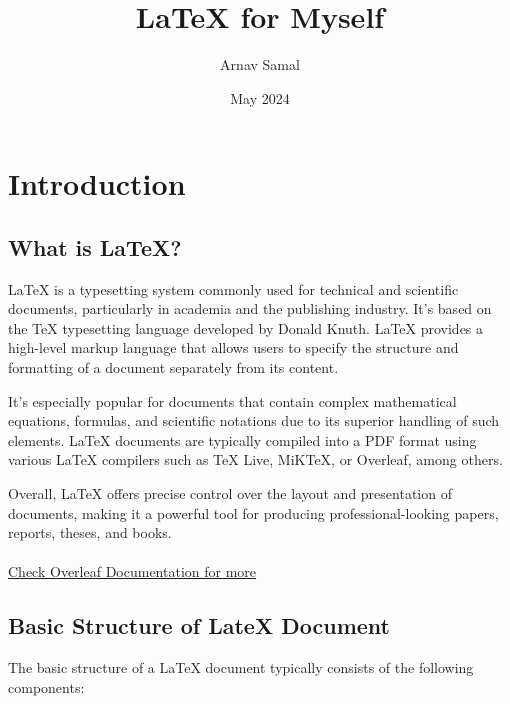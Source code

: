 \documentclass{article}
\title{LaTeX for Myself}
\author{Arnav Samal}
\date{May 2024}
\begin{document}
\maketitle

\section{Introduction}

\subsection{What is LaTeX?}

LaTeX is a typesetting system commonly used for technical and scientific documents, particularly in academia and the publishing industry. It's based on the TeX typesetting language developed by Donald Knuth. LaTeX provides a high-level markup language that allows users to specify the structure and formatting of a document separately from its content.

It's especially popular for documents that contain complex mathematical equations, formulas, and scientific notations due to its superior handling of such elements. LaTeX documents are typically compiled into a PDF format using various LaTeX compilers such as TeX Live, MiKTeX, or Overleaf, among others.

Overall, LaTeX offers precise control over the layout and presentation of documents, making it a powerful tool for producing professional-looking papers, reports, theses, and books.
\\ 
\\ \href{https://www.overleaf.com/learn}{Check Overleaf Documentation for more}

\subsection{Basic Structure of LateX Document}
The basic structure of a LaTeX document typically consists of the following components:
\end{document}
